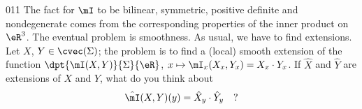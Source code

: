 \begin{corrige}{011}
The fact for $\mI$ to be bilinear, symmetric, positive definite and nondegenerate comes from the corresponding properties of the inner product on $\eR^3$. The eventual problem is smoothness. As usual, we have to find extensions. Let $X$, $Y\in\cvec(\Sigma)$; the problem is to find a (local) smooth extension of the function $\dpt{ \mI(X,Y) }{ \Sigma }{ \eR }$, $x\mapsto \mI_x(X_x,Y_x)=X_x\cdot Y_x$. If $\hat X$ and $\hat Y$ are extensions of $X$ and $Y$, what do you think about 
\[ 
 \hat\mI(X,Y)(y)=\hat X_y\cdot \hat Y_y\quad ?
\]

\end{corrige}
